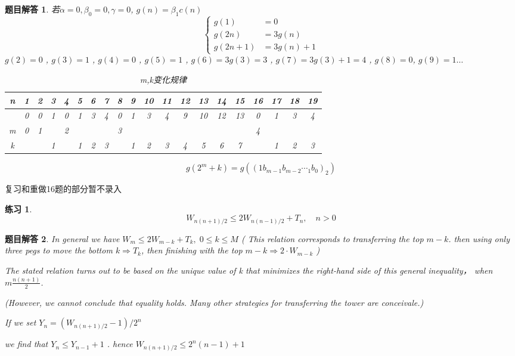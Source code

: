 \documentclass[mode=geye, chinesefont=founder]{elegantnote}
\newtheorem{exercise}{练习}
\newtheorem{answer}{题目解答}
\begin{document}
\begin{answer}
若$ \alpha=0,\beta_0=0, \gamma=0 $, $ g(n)=\beta_1 c(n) $  
\begin{equation*}
	\left\{
		\begin{aligned}
			g(1)&=0\\
			g(2n)&=3g(n)\\
			g(2n+1)&=3g(n)+1
		\end{aligned}
	\right.
\end{equation*}
$ g(2)=0 $ , $ g(3)=1 $ , $ g(4)=0 $ , $ g(5)=1 $ , 
$ g(6)=3g(3)=3 $ , $ g(7)=3g(3)+1=4 $ , $ g(8)=0 $, $ g(9)=1 \dots$  

\begin{table}[htbp]
	\centering
	\small
	\caption{m,k变化规律}
	\begin{tabular}{c|ccccc ccccc ccccc cccc}
		\toprule
		n & 1 & 2 & 3 & 4 & 5 & 6 & 7 & 8 & 9 & 10 & 11 & 12 & 13 & 14 & 15 & 16 & 17 & 18 & 19 \\
		\midrule
		& 0 & 0 & 1 & 0 & 1 & 3 & 4 & 0 & 1 & 3  & 4  & 9  & 10 & 12 & 13 & 0  & 1  & 3  & 4  \\
		m & 0 & 1 &   & 2 &   &   &   & 3 &   &    &    &    &    &    & & 4  &    &    &    \\  
		k& &   & 1 &   & 1 & 2 & 3 &   & 1 & 2  & 3  & 4  & 5  & 6  & 7 &   & 1  & 2  & 3 \\
		\bottomrule
	\end{tabular}%
	\label{tab:EX16}%
\end{table}%
\begin{equation*}
	g(2^{m}+k)=g(\left( 1 b_{m-1}b_{m-2}\dotsb_1b_0 \right)_2)
\end{equation*}
\end{answer}

复习和重做16题的部分暂不录入


\begin{exercise} 
	\begin{equation*}
		W_{n(n+1)/2} \leqslant 2W_{n(n-1)/2}+T_n, \quad n>0
	\end{equation*}
\end{exercise}

\begin{answer}
	In general we have $ W_m\leqslant 2W_{m-k}+T_k, \; 0\leqslant k \leqslant M $ 
( This relation corresponds to transferring the top $ m-k $. 
then using only three pegs to move the bottom $ k\Rightarrow T_k $, then finishing with the top $ m-k \Rightarrow 2\cdot W_{m-k} $ )

The stated relation turns out to be based on the unique value of k that minimizes the right-hand side of this general inequality， when $ m\frac{n(n+1)}{2} $.

(However, we cannot conclude that equality holds. Many other
strategies for transferring the tower are conceivale.)

If we set $ Y_n = (W_{n(n+1)/2}-1)/2^n $ 

we find that $ Y_n \leqslant Y_{n-1}+1 $ . 
hence $ W_{n(n+1)/2} \leqslant 2^n(n-1)+1 $ 
\end{answer}
\end{document}
